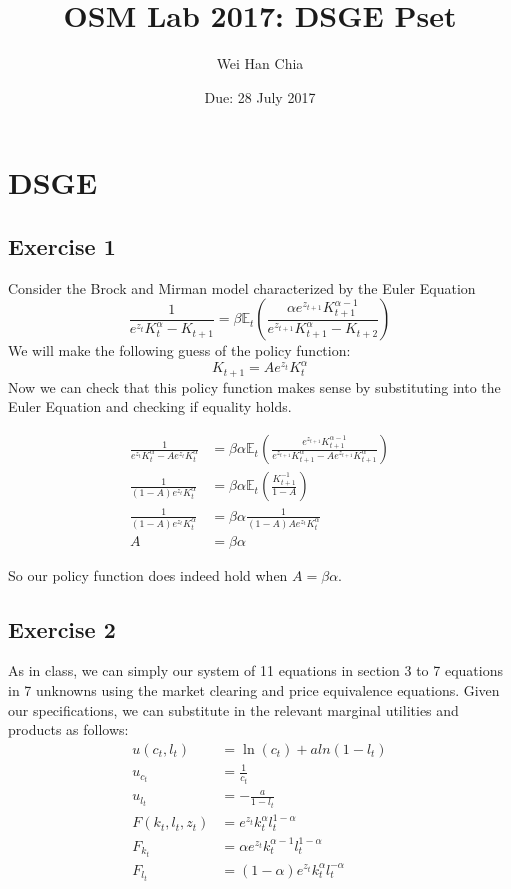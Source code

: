 \documentclass{article}
\begin{document}
	\title{OSM Lab 2017: DSGE Pset }
	\author{Wei Han Chia}
	\date{Due: 28 July 2017}
	\maketitle
	
	\section*{DSGE}
	
	\subsection*{Exercise 1}
	Consider the Brock and Mirman model characterized by the Euler Equation
	\[ \frac{1}{e^{z_t} K_t^{\alpha} - K_{t+1}} = \beta \mathbb{E}_t \left( \frac{\alpha e^{z_{t+1}} K_{t+1}^{\alpha -1}}{e^{z_{t+1}} K_{t+1}^{\alpha} - K_{t+2}}  \right) \]
	We will make the following guess of the policy function:
	\[ K_{t+1} = A e^{z_t} K_t^{\alpha} \]
	Now we can check that this policy function makes sense by substituting into the Euler Equation and checking if equality holds.
	
	\begin{align*}
	\frac{1}{e^{z_t} K_t^{\alpha} - A e^{z_t} K_t^{\alpha}} &= \beta \alpha \mathbb{E}_t \left( \frac{  e^{z_{t+1}} K_{t+1}^{\alpha -1}}{e^{z_{t+1}} K_{t+1}^{\alpha} - A e^{z_{t+1}} K_{t+1}^{\alpha}}  \right) \\
	\frac{1}{(1-A) e^{z_t} K_t^{\alpha}} &= \beta \alpha \mathbb{E}_t \left(\frac{K_{t+1}^{-1}}{1 - A} \right) \\
	\frac{1}{(1-A) e^{z_t} K_t^{\alpha}}& = \beta \alpha \frac{1}{(1-A) A e^{z_t} K_t^{\alpha}} \\
	A &= \beta \alpha
	\end{align*}
	
	So our policy function does indeed hold when $A = \beta \alpha$. 
	
	\subsection*{Exercise 2}
	As in class, we can simply our system of 11 equations in section 3 to 7 equations in 7 unknowns using the market clearing and price equivalence equations. Given our specifications, we can substitute in the relevant marginal utilities and products as follows:
	\begin{align*}
	u(c_t, l_t) &= \ln(c_t) + a ln(1-l_t) \\
	u_{c_t} &= \frac{1}{c_t} \\
	u_{l_t} &= - \frac{a}{1-l_t} \\
	F(k_t, l_t, z_t) &= e^{z_t} k_t^{\alpha} l_t^{1 - \alpha} \\
	F_{k_t} &= \alpha e^{z_t} k_t^{\alpha - 1} l_t^{1 - \alpha} \\
	F_{l_t} &= (1 -\alpha) e^{z_t} k_t^{\alpha} l_t^{-\alpha}
	\end{align*}
	
\end{document}
